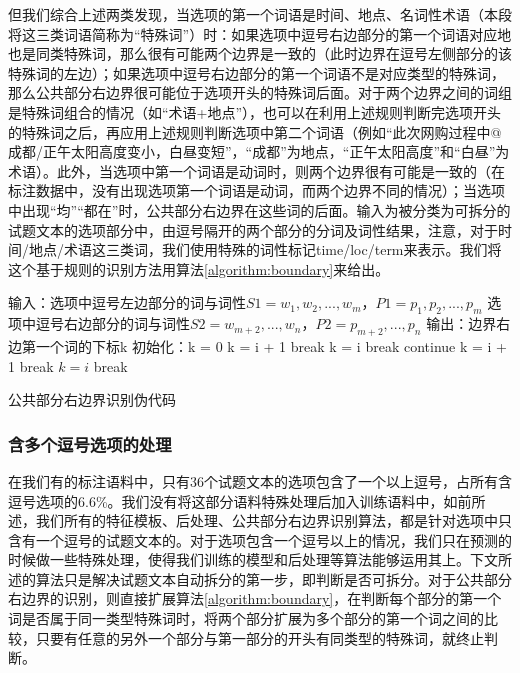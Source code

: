 \documentclass[master, winfont]{njuthesis}
\begin{document}
但我们综合上述两类发现，当选项的第一个词语是时间、地点、名词性术语（本段将这三类词语简称为“特殊词”）时：如果选项中逗号右边部分的第一个词语对应地也是同类特殊词，那么很有可能两个边界是一致的（此时边界在逗号左侧部分的该特殊词的左边）；如果选项中逗号右边部分的第一个词语不是对应类型的特殊词，那么公共部分右边界很可能位于选项开头的特殊词后面。对于两个边界之间的词组是特殊词组合的情况（如“术语+地点”），也可以在利用上述规则判断完选项开头的特殊词之后，再应用上述规则判断选项中第二个词语（例如“此次网购过程中@成都/正午太阳高度变小，白昼变短”，“成都”为地点，“正午太阳高度”和“白昼”为术语）。此外，当选项中第一个词语是动词时，则两个边界很有可能是一致的（在标注数据中，没有出现选项第一个词语是动词，而两个边界不同的情况）；当选项中出现“均”“都在”时，公共部分右边界在这些词的后面。输入为被分类为可拆分的试题文本的选项部分中，由逗号隔开的两个部分的分词及词性结果，注意，对于时间/地点/术语这三类词，我们使用特殊的词性标记time/loc/term来表示。我们将这个基于规则的识别方法用算法\ref{algorithm:boundary}来给出。

\begin{algorithm}
\begin{algorithmic}[1]
\STATE 输入：选项中逗号左边部分的词与词性$S1={w_1, w_2, ..., w_m}$，$P1={p_1, p_2, ..., p_m}$
\STATE      选项中逗号右边部分的词与词性$S2={w_{m+2}, ..., w_n}$，$P2={p_{m+2}, ..., p_n}$
\STATE 输出：边界右边第一个词的下标k
\STATE 初始化：k = 0
		\STATE k = i + 1
		\STATE break
		\STATE k = i
		\STATE break
		\STATE continue
		\STATE k = i + 1
		\STATE break
	\ELSE
		\STATE $k = i$
    	\STATE break
    \ENDIF
\ENDFOR
\end{algorithmic}
\caption{\label{algorithm:boundary}公共部分右边界识别伪代码}
\end{algorithm}

\subsubsection{含多个逗号选项的处理}
在我们有的标注语料中，只有36个试题文本的选项包含了一个以上逗号，占所有含逗号选项的6.6\%。我们没有将这部分语料特殊处理后加入训练语料中，如前所述，我们所有的特征模板、后处理、公共部分右边界识别算法，都是针对选项中只含有一个逗号的试题文本的。对于选项包含一个逗号以上的情况，我们只在预测的时候做一些特殊处理，使得我们训练的模型和后处理等算法能够运用其上。下文所述的算法只是解决试题文本自动拆分的第一步，即判断是否可拆分。对于公共部分右边界的识别，则直接扩展算法\ref{algorithm:boundary}，在判断每个部分的第一个词是否属于同一类型特殊词时，将两个部分扩展为多个部分的第一个词之间的比较，只要有任意的另外一个部分与第一部分的开头有同类型的特殊词，就终止判断。
\end{document}
